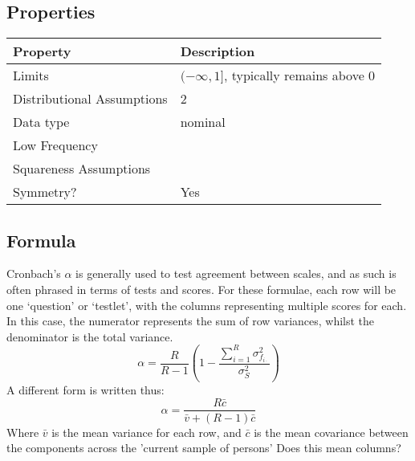 \documentclass[11pt]{article}
\begin{document}

\subsection{Properties}
\begin{tabular}{| l || l |}
    \hline
    {\bf Property} & {\bf Description} \\
    \hline
    Limits & $(-\infty, 1]$, typically remains above 0 \\ \hline

    Distributional Assumptions& 2 \\ \hline

    Data type & nominal \\ \hline

    Low Frequency &  \\ \hline

    Squareness Assumptions &  \\ \hline
    
    Symmetry? & Yes \\ \hline

\end{tabular}


\subsection{Formula}
Cronbach's $\alpha$ is generally used to test agreement between scales, and as such is often phrased in terms of tests and scores.  
For these formulae, each row will be one `question' or `testlet', with the columns representing multiple scores for each.  
In this case, the numerator represents the sum of row variances, whilst the denominator is the total variance.
$$
\alpha = \frac{ R }{ R - 1 }   \left( 1 - \frac{ \sum_{i=1}^{R}{ \sigma_{f_{i\cdot}}^2 }    }{  \sigma_{S}^2  } \right) 
$$
A different form is written thus:
$$
\alpha = \frac{ R\bar{c} }{ \bar{v} + (R - 1)\bar{c} }
$$
Where $\bar{v}$ is the mean variance for each row, and $\bar{c}$ is the mean covariance between the components across the 'current sample of persons' {\color{red} Does this mean columns?}
\end{document}
